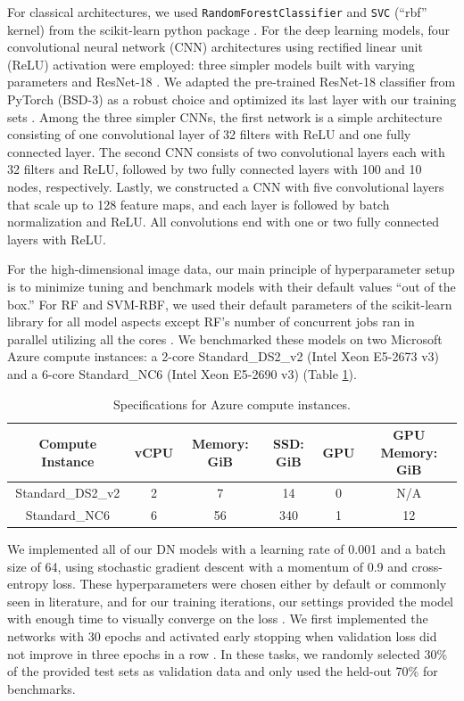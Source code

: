 For classical architectures, we used \texttt{RandomForestClassifier} and \texttt{SVC} (``rbf'' kernel) from the scikit-learn python package \citep{scikit-learn}. For the deep learning models, four convolutional neural network (CNN) architectures using rectified linear unit (ReLU) activation were employed: three simpler models built with varying parameters and ResNet-18 \citep{resnet}. We adapted the pre-trained ResNet-18 classifier from PyTorch (BSD-3) as a robust choice and optimized its last layer with our training sets \citep{pytorch}. Among the three simpler CNNs, the first network is a simple architecture consisting of one convolutional layer of 32 filters with ReLU and one fully connected layer. The second CNN consists of two convolutional layers each with 32 filters and ReLU, followed by two fully connected layers with 100 and 10 nodes, respectively. Lastly, we constructed a CNN with five convolutional layers that scale up to 128 feature maps, and each layer is followed by batch normalization and ReLU. All convolutions end with one or two fully connected layers with ReLU.

For the high-dimensional image data, our main principle of hyperparameter setup is to minimize tuning and benchmark models with their default values ``out of the box.'' For RF and SVM-RBF, we used their default parameters of the scikit-learn library for all model aspects except RF's number of concurrent jobs ran in parallel utilizing all the cores \citep{scikit-learn}. We benchmarked these models on two Microsoft Azure compute instances: a 2-core Standard\_DS2\_v2 (Intel Xeon E5-2673 v3) and a 6-core Standard\_NC6 (Intel Xeon E5-2690 v3) (Table \ref{table:azure}).

\begin{table}[!htb]
\centering
\begin{tabular}{ |c|c|c|c|c|c| } 
\hline
Compute Instance & vCPU & Memory: GiB & SSD: GiB & GPU & GPU Memory: GiB \\
\hline
Standard\_DS2\_v2 & 2 & 7 & 14 & 0 & N/A \\
\hline
Standard\_NC6 & 6 & 56 & 340 & 1 & 12 \\
\hline
\end{tabular}
\caption{Specifications for Azure compute instances.}
\label{table:azure}
\end{table}

We implemented all of our DN models with a learning rate of 0.001 and a batch size of 64, using stochastic gradient descent with a momentum of 0.9 and cross-entropy loss. These hyperparameters were chosen either by default or commonly seen in literature, and for our training iterations, our settings provided the model with enough time to visually converge on the loss \citep{Krizhevsky2012-sq, pmlr-v119-rice20a}.
We first implemented the networks with 30 epochs and activated early stopping when validation loss did not improve in three epochs in a row \citep{li, lutz, caruana}. In these tasks, we randomly selected 30\% of the provided test sets as validation data and only used the held-out 70\% for benchmarks.

